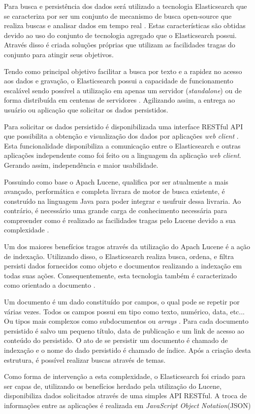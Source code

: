 Para busca e persistência dos dados será utilizado a tecnologia Elasticsearch que se caracteriza por ser um conjunto de mecanismo de busca open-source que realiza buscas e analisar dados em tempo real \cite{Gil:2010}. Estas características são obtidas devido ao uso do conjunto de tecnologia agregado que o Elasticsearch possui. Através disso é criada soluções próprias que utilizam as  facilidades tragas do conjunto para atingir seus objetivos.

Tendo como principal objetivo facilitar a busca por texto e a rapidez no acesso aos dados e gravação, o Elasticsearch possui a capacidade de funcionamento escalável sendo possível a utilização em apenas um servidor (\textit{standalone}) ou de forma distribuída em centenas de servidores \cite{Gormley:2015}. Agilizando assim, a entrega ao usuário ou aplicação que solicitar os dados persistidos.

Para solicitar os dados persistido é disponibilizada uma interface RESTful API que possibilita a obtenção e visualização dos dados por aplicações \textit{web client} \cite{Gormley:2015}. Esta funcionalidade disponibiliza a comunicação entre o Elasticsearch e outras aplicações independente como foi feito ou a linguagem da aplicação \textit{web client}. Gerando assim, independência e maior usabilidade.

Possuindo como base o Apach Lucene, qualifica por ser atualmente a mais avançado, performática e completa livrara de motor de busca existente, é construído na linguagem Java para poder integrar e usufruir dessa livraria. Ao contrário, é necessário uma grande carga de conhecimento necessária para compreender como é realizado as facilidades tragas pelo Lucene devido a sua complexidade \cite{Gormley:2015}.

Um dos maiores benefícios tragos através da utilização do Apach Lucene é a ação de indexação. Utilizando disso, o Elasticsearch realiza busca, ordena, e filtra persisti dados fornecidos como objeto e documentos realizando a indexação em todas suas ações. Consequentemente, esta tecnologia também é caracterizado como orientado a documento \cite{Gormley:2015}.

Um documento é um dado constituído por campos, o qual pode se repetir por várias vezes. Todos os campos possui em tipo como texto, numérico, data, etc... Ou tipos mais complexos como subdocumentos ou \textit{arrays} \cite{Kuc:2013}. Para cada documento persistido é salvo um pequeno título, data de publicação e um link de acesso ao conteúdo do persistido. O ato de se persistir um documento é chamado de indexação e o nome do dado persistido é chamado de índice. Após a criação desta estrutura, é possível realizar buscas através de temas. 

Como forma de intervenção a esta complexidade, o Elasticsearch foi criado para  ser capas de, utilizando os benefícios herdado pela utilização do Lucene, disponibiliza dados solicitados através de uma simples API RESTful. A troca de informações entre as aplicações é realizada em \textit{JavaScript Object Notation}(JSON)
